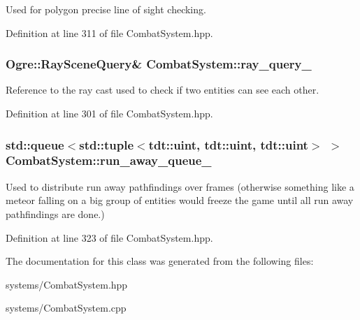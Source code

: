 Used for polygon precise line of sight checking. 



Definition at line 311 of file Combat\+System.\+hpp.

\subsubsection[{\texorpdfstring{ray\+\_\+query\+\_\+}{ray_query_}}]{\setlength{\rightskip}{0pt plus 5cm}Ogre\+::\+Ray\+Scene\+Query\& Combat\+System\+::ray\+\_\+query\+\_\+\hspace{0.3cm}{\ttfamily [private]}}\hypertarget{class_combat_system_a03b947e997e7138738daf26f48eac7dd}{}\label{class_combat_system_a03b947e997e7138738daf26f48eac7dd}


Reference to the ray cast used to check if two entities can see each other. 



Definition at line 301 of file Combat\+System.\+hpp.

\subsubsection[{\texorpdfstring{run\+\_\+away\+\_\+queue\+\_\+}{run_away_queue_}}]{\setlength{\rightskip}{0pt plus 5cm}std\+::queue$<$std\+::tuple$<$tdt\+::uint, tdt\+::uint, tdt\+::uint$>$ $>$ Combat\+System\+::run\+\_\+away\+\_\+queue\+\_\+\hspace{0.3cm}{\ttfamily [private]}}\hypertarget{class_combat_system_aafe37a8f7fa29174c136c747a3d7ee54}{}\label{class_combat_system_aafe37a8f7fa29174c136c747a3d7ee54}


Used to distribute run away pathfindings over frames (otherwise something like a meteor falling on a big group of entities would freeze the game until all run away pathfindings are done.) 



Definition at line 323 of file Combat\+System.\+hpp.



The documentation for this class was generated from the following files\+:\begin{DoxyCompactItemize}
\item 
systems/Combat\+System.\+hpp\item 
systems/Combat\+System.\+cpp\end{DoxyCompactItemize}
